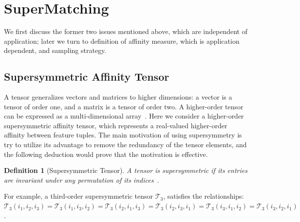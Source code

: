 \section{SuperMatching}
\label{sec:supersymhopm}
We first discuss the former two issues mentioned above, which are independent of application; later we turn to definition of affinity measure, which is application dependent, and sampling strategy.


\subsection{Supersymmetric Affinity Tensor}
\label{subsec:supersymtensor}

A tensor generalizes vectors and matrices to higher dimensions: a vector is a tensor of order one,
and a matrix is a tensor of order two. A higher-order tensor can be expressed as a multi-dimensional array~\cite{Kolda08}.
Here we consider a higher-order supersymmetric affinity tensor, which represents a real-valued higher-order affinity between feature tuples.
The main motivation of using supersymmetry is try to utilize its advantage to remove the redundancy of the tensor elements, 
and the following deduction would prove that the motivation is effective.

\newtheorem{mot}{Definition}
\begin{mot}[Supersymmetric Tensor]
\label{mot:def1}
A tensor is  \emph{supersymmetric} if its entries are invariant under any permutation of its indices~\cite{Kofidis02}.
\end{mot}

For example, a third-order supersymmetric tensor $\mathcal{T}_3$, satisfies the relationships:
$\mathcal{T}_3(i_1, i_2, i_3)=\mathcal{T}_3(i_1, i_3, i_2)=\mathcal{T}_3(i_2, i_1, i_3)=\mathcal{T}_3(i_2, i_3, i_1)=\mathcal{T}_3(i_3, i_1, i_2)=\mathcal{T}_3(i_3, i_2, i_1)$.

